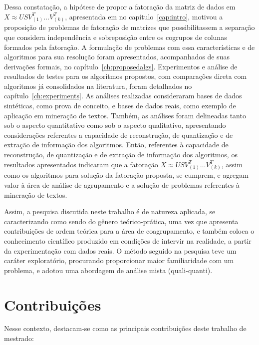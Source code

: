\documentclass[
    12pt,                %
    oneside,            %
    a4paper,            %
    english,            %
    brazil                %
    ]{abntex2ppgsi}
\begin{document}
Dessa constatação, a hipótese de propor a fatoração da matriz de dados em $X \approx USV_{(1)}^T \dots V_{(k)}^T$, apresentada em no capítulo~\ref{cap:intro}, motivou a proposição de problemas de fatoração de matrizes que possibilitassem a separação que considera independência e sobreposição entre os cogrupos de colunas formados pela fatoração.
A formulação de problemas com essa características e de algoritmos para sua resolução foram apresentados, acompanhados de suas derivações formais, no capítulo~\ref{ch:proposedalgs}.
Experimentos e análise de resultados de testes para os algoritmos propostos, com comparações direta com algoritmos já consolidados na literatura, foram detalhados no capítulo~\ref{ch:experiments}.
As análises realizadas consideraram bases de dados sintéticas, como prova de conceito, e bases de dados reais, como exemplo de aplicação em mineração de textos.
Também, as análises foram delineadas tanto sob o aspecto quantitativo como sob o aspecto qualitativo, apresentando considerações referentes a capacidade de reconstrução, de quantização e de extração de informação dos algoritmos.
Então, referentes à capacidade de reconstrução, de quantização e de extração de informação dos algoritmos, os resultados apresentados indicaram que a fatoração $X \approx USV_{(1)}^T \dots V_{(k)}^T$, assim como os algoritmos para solução da fatoração proposta, se cumprem, e agregam valor à área de análise de agrupamento e a solução de problemas referentes à mineração de textos.

Assim, a pesquisa discutida neste trabalho é de natureza aplicada, se caracterizando como sendo do gênero teórico-prática, uma vez que apresenta contribuições de ordem teórica para a área de coagrupamento, e também coloca o conhecimento científico produzido em condições de intervir na realidade, a partir da experimentação com dados reais. O método seguido na pesquisa teve um caráter exploratório, procurando proporcionar maior familiaridade com um problema, e adotou uma abordagem de análise mista (quali-quanti).

\section{Contribuições}

Nesse contexto, destacam-se como as principais contribuições deste trabalho de mestrado:
\end{document}

